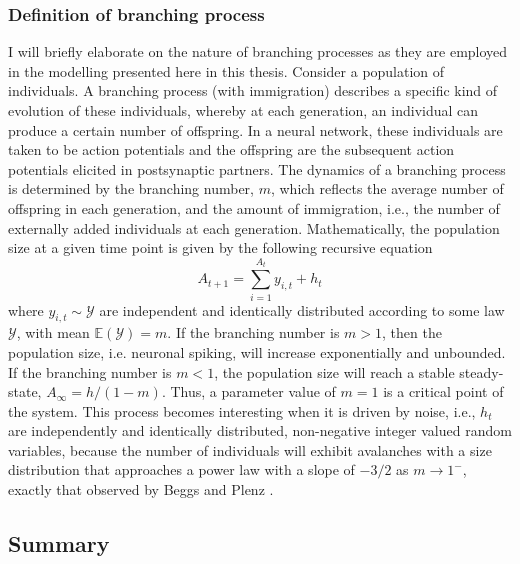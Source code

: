 \subsubsection{Definition of branching process} \label{sec:branching_prcoess}
I will briefly elaborate on the nature of branching processes as they are employed in the modelling presented here in this thesis. Consider a population of individuals. A branching process (with immigration) describes a specific kind of evolution of these individuals, whereby at each generation, an individual can produce a certain number of offspring. In a neural network, these individuals are taken to be action potentials and the offspring are the subsequent action potentials elicited in postsynaptic partners. The dynamics of a branching process is determined by the branching number, $m$, which reflects the average number of offspring in each generation, and the amount of immigration, i.e., the number of externally added individuals at each generation. Mathematically, the population size at a given time point is given by the following recursive equation \cite{Wilting2018}
\begin{equation}
    A_{t+1} = \sum_{i=1}^{A_{t}} y_{i,t} + h_t
\end{equation}
where $y_{i,t}\sim\mathcal{Y}$ are independent and identically distributed according to some law $\mathcal{Y}$, with mean $\mathbb{E}(\mathcal{Y})=m$. If the branching number is $m>1$, then the population size, i.e. neuronal spiking, will increase exponentially and unbounded. If the branching number is $m<1$, the population size will reach a stable steady-state, $A_{\infty}=h/(1-m)$. Thus, a parameter value of $m=1$ is a critical point of the system. This process becomes interesting when it is driven by noise, i.e., $h_t$ are independently and identically distributed, non-negative integer valued random variables, because the number of individuals will exhibit avalanches with a size distribution that approaches a power law with a slope of $-3/2$ as $m\to1^-$, exactly that observed by Beggs and Plenz \cite{Beggs2003}.

\subsection{Summary}